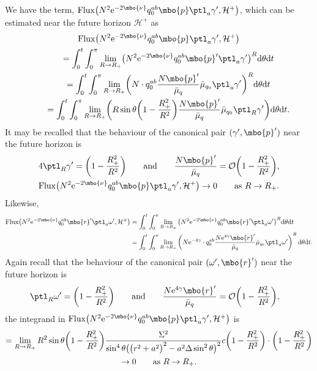 We have the term, ${\rm Flux} \bigl(N^2 {\rm e}^{-2 \mbo{\nu}}q^{ab}_0 \mbo{p} \ptl_a \gamma', \mathcal{H}^+\bigr)$, which can be estimated near the future horizon $\mathcal{H}^+$ as
\begin{gather*}
 {\rm Flux} \bigl(N^2 {\rm e}^{-2 \mbo{\nu}}q^{ab}_0 \mbo{p} \ptl_a \gamma', \mathcal{H}^+\bigr) \notag\\
\qquad{} =
\int^t_0 \int^\pi_0 \lim_{R \to R_+} \bigl(
N^2 {\rm e}^{-2 \mbo{\nu}}q^{ab}_0 \mbo{p}' \ptl_a \gamma' \bigr)^R {\rm d} \theta {\rm d}t \notag\\
\qquad{} = \int^t_0 \int^\pi_0 \lim_{R \to R_+} \biggl( N \cdot q^{ab}_0 \frac{N \mbo{p}'}{\bar{\mu}_q} \bar{\mu}_{q_0} \ptl_a \gamma' \biggr)^R {\rm d}\theta {\rm d}t \notag\\
\qquad{} = \int^t_0 \int^\pi_0 \lim_{R \to R_+} \biggl( R \sin \theta\biggl(1- \frac{R^2_+}{R^2} \biggr) \frac{N \mbo{p}' }{\bar{\mu}_q} \bar{\mu}_{q_0} \ptl_R \gamma' \biggr) {\rm d}\theta {\rm d}t.
\end{gather*}
It may be recalled that the behaviour of the canonical pair $(\gamma',\mbo{p}') $ near the future horizon is
\begin{align*}
&4 \ptl_R \gamma'= \biggl(1- \frac{R^2_+}{R^2} \biggr) \qquad \text{and} \qquad \frac{N \mbo{p}'}{\bar{\mu}_q} = \mathcal{O} \biggl(1- \frac{R^2_+}{R^2} \biggr), \notag\\
&{\rm Flux} \bigl(N^2 {\rm e}^{-2 \mbo{\nu}}q^{ab}_0 \mbo{p} \ptl_a \gamma', \mathcal{H}^+\bigr) \to 0 \qquad \text{as} \ R \to R_+.
\end{align*}
Likewise,
\begin{align*}
{\rm Flux} \bigl(N^2 {\rm e}^{-2 \mbo{\nu}}q^{ab}_0 \mbo{r}' \ptl_a \omega', \mathcal{H}^+\bigr)%
&{}=
\int^t_0 \int^\pi_0 \lim_{R \to R_+} \big( N^2 {\rm e}^{-2 \mbo{\nu}}q^{ab}_0 \mbo{r}' \ptl_a \omega' \big)^R {\rm d}\theta {\rm d} t \notag\\
&{}= \int^t_0 \int^\pi_0 \lim_{R \to R_+} \left( N {\rm e}^{-4\gamma} \cdot q^{ab}_0 \frac{N {\rm e}^{4\gamma} \mbo{r}'}{\bar{\mu}_q} \bar{\mu}_{q_0} \ptl_a \omega' \right)^R {\rm d}\theta {\rm d}t. \notag
\end{align*}
Again recall that the behaviour of the canonical pair $(\omega', \mbo{r}')$ near the future horizon is
\begin{align*}
\ptl_R \omega' &{}= \biggl(1- \frac{R^2_+}{R^2} \biggr) \qquad \text{and} \qquad \frac{N {\rm e}^{4 \gamma} \mbo{r}'}{\bar{\mu}_q} = \mathcal{O}\biggl(1- \frac{R^2_+}{R^2} \biggr), \end{align*}
the integrand in ${\rm Flux} \bigl(N^2 {\rm e}^{-2 \mbo{\nu}}q^{ab}_0 \mbo{p} \ptl_a \gamma', \mathcal{H}^+\bigr)$ is
\begin{gather*}
= \lim_{R \to R_+} R^2 \sin \theta \biggl(1- \frac{R^2_+}{R^2} \biggr) \frac{\Sigma^2}{ \sin^4 \theta \bigl(\bigl(r^2+a^2\bigr)^2-a^2 \Delta \sin^2 \theta \bigr)^2}
 c \biggl(1-\frac{R^2_+}{R^2} \biggr) \cdot \biggl(1-\frac{R^2_+}{R^2} \biggr) \notag\\
 \to 0 \qquad \text{as} \ R \to R_+.
\end{gather*}

